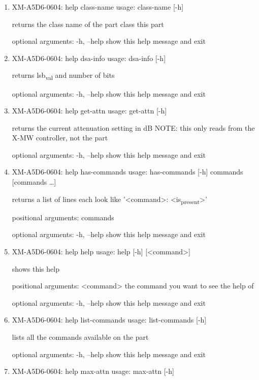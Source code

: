 \documentclass[11pt]{article}
\begin{document}
\begin{enumerate}
\item XM-A5D6-0604: help class-name
\label{sec:orgf9189e0}
usage: class-name [-h]

returns the class name of the part class this part

optional arguments:
  -h, --help  show this help message and exit

\item XM-A5D6-0604: help dsa-info
\label{sec:org923348a}
usage: dsa-info [-h]

returns lsb\textsubscript{val} and number of bits

optional arguments:
  -h, --help  show this help message and exit

\item XM-A5D6-0604: help get-attn
\label{sec:orge044549}
usage: get-attn [-h]

returns the current attenuation setting in dB NOTE: this only reads from the
X-MW controller, not the part

optional arguments:
  -h, --help  show this help message and exit

\item XM-A5D6-0604: help has-commands
\label{sec:org16c348d}
usage: has-commands [-h] commands [commands \ldots{}]

returns a list of lines each look like '<command>: <is\textsubscript{present}>'

positional arguments:
  commands

optional arguments:
  -h, --help  show this help message and exit

\item XM-A5D6-0604: help help
\label{sec:orgd0496a4}
usage: help [-h] [<command>]

shows this help

positional arguments:
  <command>   the command you want to see the help of

optional arguments:
  -h, --help  show this help message and exit

\item XM-A5D6-0604: help list-commands
\label{sec:org8574642}
usage: list-commands [-h]

lists all the commands available on the part

optional arguments:
  -h, --help  show this help message and exit

\item XM-A5D6-0604: help max-attn
\label{sec:orgb2191bb}
usage: max-attn [-h]


\end{enumerate}
\end{document}
